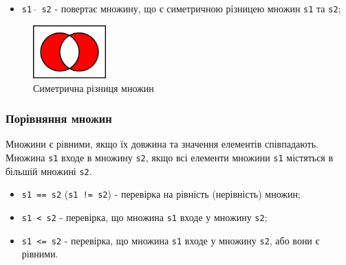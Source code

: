 \begin{frame}
\begin{itemize}
    \item \texttt{s1 $\hat{}$ s2} - повертає множину, що є симетричною різницею множин \texttt{s1} та \texttt{s2};
\end{itemize}
 \begin{figure}
\begin{center}
 \includegraphics[width=0.25\textwidth]{pictures/xor.png}
\caption{Симетрична різниця множин}
\label{xor} 
\end{center}
\end{figure} 
\end{frame}

\begin{frame}
\frametitle{Порівняння множин}
Множини є рівними, якщо їх довжина та значення елементів співпадають. Множина \texttt{s1} входе в множину \texttt{s2}, якщо всі елементи множини \texttt{s1} містяться в більшій множині \texttt{s2}.
\begin{itemize}
    \item \texttt{s1 == s2} (\texttt{s1 != s2}) - перевірка на рівність (нерівність) множин;
    \item \texttt{s1 < s2} - перевірка, що множина \texttt{s1}  входе у множину \texttt{s2};
    \item \texttt{s1 <= s2} - перевірка, що множина \texttt{s1}  входе у множину \texttt{s2}, або вони є рівними.
\end{itemize}
\end{frame}
